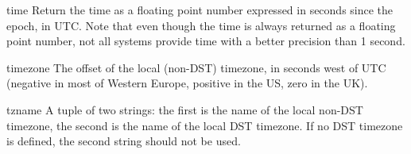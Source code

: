 \begin{funcdesc}{time}{}
Return the time as a floating point number expressed in seconds since
the epoch, in UTC.  Note that even though the time is always returned
as a floating point number, not all systems provide time with a better
precision than 1 second.
\end{funcdesc}

\begin{datadesc}{timezone}
The offset of the local (non-DST) timezone, in seconds west of UTC
(negative in most of Western Europe, positive in the US, zero in the
UK).
\end{datadesc}

\begin{datadesc}{tzname}
A tuple of two strings: the first is the name of the local non-DST
timezone, the second is the name of the local DST timezone.  If no DST
timezone is defined, the second string should not be used.
\end{datadesc}


\begin{seealso}
\end{seealso}

